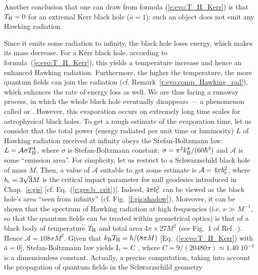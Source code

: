 Another conclusion that one can draw from formula (\ref{e:evo:T_H_Kerr}) is
that $T_{\rm H}=0$ for an extremal Kerr black hole ($\bar{a}=1$): such an object does not emit any Hawking radiation.

Since it emits some radiation to infinity, the black hole loses energy, which
makes its mass decrease. For a Kerr black hole, according to formula~(\ref{e:evo:T_H_Kerr}),
this yields a temperature increase and hence an enhanced Hawking radiation. Furthermore,
the higher the temperature,
the more quantum fields can join the radiation
(cf. Remark~\ref{r:evo:comp_Hawking_rad}), which enhances
the rate of energy loss as well. We are thus facing a runaway process, in which the whole
black hole eventually disappears --- a phenomenon called
 or
.
However, this evaporation occurs on extremely long time scales for astrophysical black holes.
To get a rough estimate of the evaporation time, let us consider
that the total power
(energy radiated per unit time or luminosity) $L$ of Hawking radiation received at infinity
obeys the Stefan-Boltzmann law:
$L = \mathcal{A} \sigma T_{\rm H}^4$, where $\sigma$ is Stefan-Boltzmann constant:
$\sigma = \pi^2 k_{\rm B}^4/(60 \hbar^3)$ and $\mathcal{A}$ is some ``emission area''.
For simplicity, let us restrict to a Schwarzschild black hole of mass $M$. Then, a value
of $\mathcal{A}$ suitable to get some estimate is
$\mathcal{A} = 4\pi b_{\rm c}^2$, where
$b_{\rm c} = 3\sqrt{3} M$ is the critical impact parameter for null geodesics
introduced in Chap.~\ref{s:gis} [cf. Eq.~(\ref{e:ges:b_crit})]. Indeed, $4 \pi b_{\rm c}^2$
can be viewed as the black hole's area ``seen from infinity'' (cf. Fig.~\ref{f:gis:shadow}).
Moreover, it can be shown that the spectrum of Hawking radiation at high frequencies (i.e. $\nu \gg M^{-1}$, so that the quantum fields can be treated within geometrical optics) is that of a black
body of temperature $T_{\rm H}$ and total area $4\pi \times 27 M^2$ (see Fig.~1 of Ref.~\cite{Page76}). Hence
$\mathcal{A} = 108\pi M^2$. Given that
$k_{\rm B} T_{\rm H} = \hbar/(8\pi M)$ [Eq.~(\ref{e:evo:T_H_Kerr}) with $\bar{a}=0$],
Stefan-Boltzmann law yields
\be \label{e:evo:Hawking_rad_power}
    L = C  ,
\ee
where $C = 9 / (20480\pi) \simeq 1.40\; 10^{-4}$ is a dimensionless constant.
Actually, a precise computation, taking
into account the propagation of quantum fields in the Schwarzschild geometry
